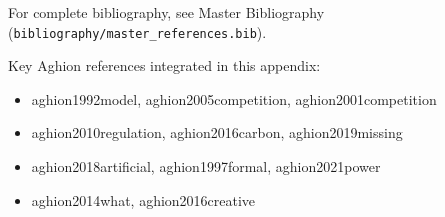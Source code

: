 \nocite{bcm_master}

For complete bibliography, see Master Bibliography (\texttt{bibliography/master\_references.bib}).

Key Aghion references integrated in this appendix:
\begin{itemize}[nosep]
    \item aghion1992model, aghion2005competition, aghion2001competition
    \item aghion2010regulation, aghion2016carbon, aghion2019missing
    \item aghion2018artificial, aghion1997formal, aghion2021power
    \item aghion2014what, aghion2016creative
\end{itemize}


